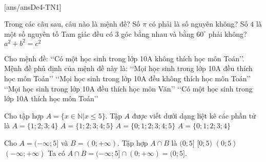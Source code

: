 ﻿﻿\begin{name}
	{\tenchude}
	{\tendethi}
	{\tentruong}
	{\thoigian}
\end{name}
\setcounter{ex}{0}\setcounter{bt}{0}
\TN
{}[ans/ansDe4-TN1]
\begin{ex}%
	Trong các câu sau, câu nào là mệnh đề?
	\choice
	{Số $\pi $ có phải là số nguyên không?}
	{\True Số $4 $ là một số nguyên tố}
	{Tam giác đều  có $3$ góc bằng nhau và bằng $60^\circ$ phải không?}
	{$a^2+b^2=c^2 $}
\end{ex}

\begin{ex}%
	Cho mệnh đề: \lq\lq Có một học sinh trong lớp 10A không thích học môn Toán\rq\rq. Mệnh đề phủ định của mệnh đề này là:
	\choice
	{\True \lq\lq Mọi học sinh trong lớp 10A đều thích học môn Toán\rq\rq}
	{\lq\lq Mọi học sinh trong lớp 10A đều không thích học môn Toán\rq\rq}
	{\lq\lq Mọi học sinh trong lớp 10A đều thích học môn Văn\rq\rq}
	{\lq\lq Có một học sinh trong lớp 10A thích học môn Toán\rq\rq}
\end{ex}

\begin{ex}%
	Cho tập hợp $A=\{x\in \mathbb{N}|x\leq 5\}$. Tập $A$ được viết dưới dạng liệt kê các phần tử là
	\choice
	{$A=\{1;2;3;4\}$}
	{$A=\{1;2;3;4;5\}$}
	{\True $A=\{0;1;2;3;4;5\}$}
	{$A=\{0;1;2;3;4\}$}
\end{ex}

\begin{ex}%
	Cho $A=(-\infty;5]$ và $B=(0;+\infty)$. Tập hợp $A\cap B$ là
	\choice
	{\True $(0;5]$}
	{$[0;5)$}
	{$(0;5)$}
	{$(-\infty;+\infty)$}
	\loigiai
	{
		Ta có $A\cap B = (-\infty;5]\cap (0;+\infty) = (0;5]$.
	}
\end{ex}

